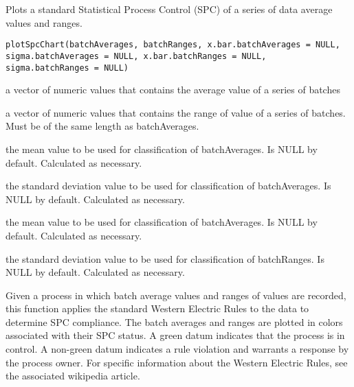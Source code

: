 \documentclass[a4paper]{book}
\begin{document}
%
\begin{Description}\relax
Plots a standard Statistical Process Control (SPC) of a series of data average values and ranges. 
\end{Description}
%
\begin{Usage}
\begin{verbatim}
plotSpcChart(batchAverages, batchRanges, x.bar.batchAverages = NULL, sigma.batchAverages = NULL, x.bar.batchRanges = NULL, sigma.batchRanges = NULL)
\end{verbatim}
\end{Usage}
%
\begin{Arguments}
\begin{ldescription}
\item[\code{batchAverages}] 
a vector of numeric values that contains the average value of a series of batches

\item[\code{batchRanges}] 
a vector of numeric values that contains the range of value of a series of batches.  Must be of the same length as batchAverages. 

\item[\code{x.bar.batchAverages}] 
the mean value to be used for classification of batchAverages.  Is NULL by default.  Calculated as necessary.

\item[\code{sigma.batchAverages}] 
the standard deviation value to be used for classification of batchAverages.  Is NULL by default.  Calculated as necessary.

\item[\code{x.bar.batchRanges}] 
the mean value to be used for classification of batchAverages.  Is NULL by default.  Calculated as necessary.

\item[\code{sigma.batchRanges}] 
the standard deviation value to be used for classification of batchRanges.  Is NULL by default.  Calculated as necessary.

\end{ldescription}
\end{Arguments}
%
\begin{Details}\relax
Given a process in which batch average values and ranges of values are recorded, this function applies the standard Western Electric Rules
to the data to determine SPC compliance.  The batch averages and ranges are plotted in colors associated with their SPC status.  A green
datum indicates that the process is in control.  A non-green datum indicates a rule violation and warrants a response by the process owner.
For specific information about the Western Electric Rules, see the associated wikipedia article. 
\end{Details}
\end{document}
